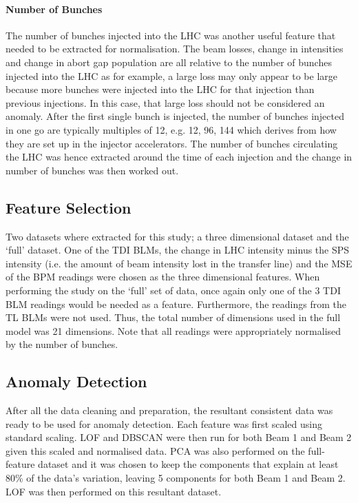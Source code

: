 \documentclass[conference, a4paper]{IEEEtran}
\begin{document}
	\paragraph{Number of Bunches}The number of bunches injected into the LHC was another useful feature that needed to be extracted for normalisation. The beam losses, change in intensities and change in abort gap population are all relative to the number of bunches injected into the LHC as for example, a large loss may only appear to be large because more bunches were injected into the LHC for that injection than previous injections. In this case, that large loss should not be considered an anomaly. After the first single bunch is injected, the number of bunches injected in one go are typically multiples of 12, e.g. 12, 96, 144 which derives from how they are set up in the injector accelerators. The number of bunches circulating the LHC was hence extracted around the time of each injection and the change in number of bunches was then worked out.
	
	\subsection{Feature Selection}
	\par Two datasets where extracted for this study; a three dimensional dataset and the `full' dataset. One of the TDI BLMs, the change in LHC intensity minus the SPS intensity (i.e. the amount of beam intensity lost in the transfer line) and the MSE of the BPM readings were chosen as the three dimensional features. When performing the study on the `full' set of data, once again only one of the 3 TDI BLM readings would be needed as a feature. Furthermore, the readings from the TL BLMs were not used. Thus, the total number of dimensions used in the full model was 21 dimensions. Note that all readings were appropriately normalised by the number of bunches.

	\subsection{Anomaly Detection}

	\par After all the data cleaning and preparation, the resultant consistent data was ready to be used for anomaly detection. Each feature was first scaled using standard scaling. LOF and DBSCAN were then run for both Beam 1 and Beam 2 given this scaled and normalised data. PCA was also performed on the full-feature dataset and it was chosen to keep the components that explain at least 80\% of the data's variation, leaving 5 components for both Beam 1 and Beam 2. LOF was then performed on this resultant dataset.
	
\end{document}
